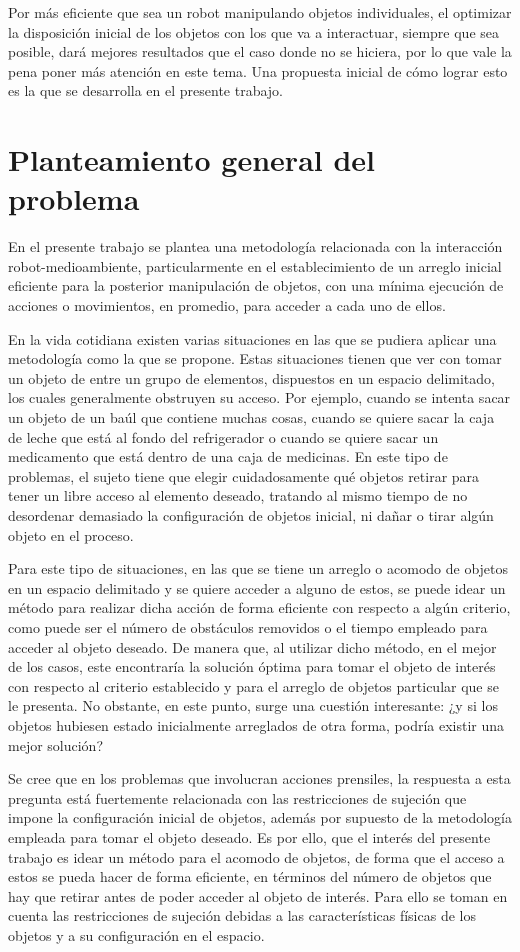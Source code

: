 Por más eficiente que sea un robot manipulando objetos individuales, el optimizar la disposición inicial de los objetos con los que va a interactuar, siempre que sea posible, dará mejores resultados que el caso donde no se hiciera, por lo que vale la pena poner más atención en este tema.
Una propuesta inicial de cómo lograr esto es la que se desarrolla en el presente trabajo.
%
%
\section{Planteamiento general del problema}
%
%
En el presente trabajo se plantea una metodología relacionada con la interacción robot-medioambiente, particularmente en el establecimiento de un arreglo inicial eficiente para la posterior manipulación de objetos, con una mínima ejecución de acciones o movimientos, en promedio, para acceder a cada uno de ellos.

En la vida cotidiana existen varias situaciones en las que se pudiera aplicar una metodología como la que se propone.
Estas situaciones tienen que ver con tomar un objeto de entre un grupo de elementos, dispuestos en un espacio delimitado, los cuales generalmente obstruyen su acceso.
Por ejemplo, cuando se intenta sacar un objeto de un baúl que contiene muchas cosas, cuando se quiere sacar la caja de leche que está al fondo del refrigerador o cuando se quiere sacar un medicamento que está dentro de una caja de medicinas.
En este tipo de problemas, el sujeto tiene que elegir cuidadosamente qué objetos retirar para tener un libre acceso al elemento deseado, tratando al mismo tiempo de no desordenar demasiado la configuración de objetos inicial, ni dañar o tirar algún objeto en el proceso.

Para este tipo de situaciones, en las que se tiene un arreglo o acomodo de objetos en un espacio delimitado y se quiere acceder a alguno de estos, se puede idear un método para realizar dicha acción de forma eficiente con respecto a algún criterio, como puede ser el número de obstáculos removidos o el tiempo empleado para acceder al objeto deseado.
De manera que, al utilizar dicho método, en el mejor de los casos, este encontraría la solución óptima para tomar el objeto de interés con respecto al criterio establecido y para el arreglo de objetos particular que se le presenta.
No obstante, en este punto, surge una cuestión interesante: ¿y si los objetos hubiesen estado inicialmente arreglados de otra forma, podría existir una mejor solución?

Se cree que en los problemas que involucran acciones prensiles, la respuesta a esta pregunta está fuertemente relacionada con las restricciones de sujeción que impone la configuración inicial de objetos, además por supuesto de la metodología empleada para tomar el objeto deseado.
Es por ello, que el interés del presente trabajo es idear un método para el acomodo de objetos, de forma que el acceso a estos se pueda hacer de forma eficiente, en términos del número de objetos que hay que retirar antes de poder acceder al objeto de interés.
Para ello se toman en cuenta las restricciones de sujeción debidas a las características físicas de los objetos y a su configuración en el espacio.

